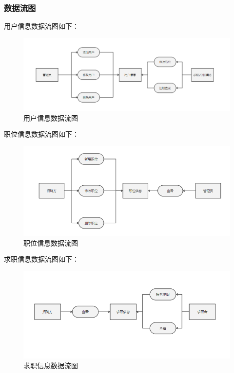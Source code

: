 \documentclass[UTF8,a4paper,10pt]{ctexart}
\begin{document}
\subsubsection{数据流图}

用户信息数据流图如下：

\begin{figure}[H]
    \centering
    \includegraphics[width=\textwidth]{img/用户信息数据流图.png}
    \caption{用户信息数据流图}
    \label{fig:用户信息数据流图}
\end{figure}

职位信息数据流图如下：

\begin{figure}[H]
    \centering
    \includegraphics[width=\textwidth]{img/职位信息数据流图.png}
    \caption{职位信息数据流图}
    \label{fig:职位信息数据流图}
\end{figure}

求职信息数据流图如下：

\begin{figure}[H]
    \centering
    \includegraphics[width=\textwidth]{img/求职信息数据流图.png}
    \caption{求职信息数据流图}
    \label{fig:求职信息数据流图}
\end{figure}
\end{document}
